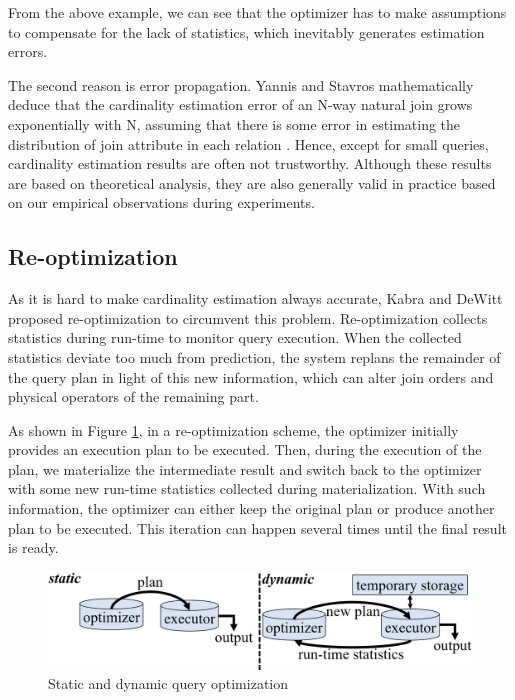     From the above example, we can see that the optimizer has to make assumptions to compensate for the lack of statistics, which inevitably generates estimation errors.\par
    The second reason is error propagation. Yannis and Stavros mathematically deduce that the cardinality estimation error of an N-way natural join grows exponentially with N, assuming that there is some error in estimating the distribution of join attribute in each relation \cite{paper31}. Hence, except for small queries, cardinality estimation results are often not trustworthy. Although these results are based on theoretical analysis, they are also generally valid in practice based on our empirical observations during experiments.\par

\subsection{Re-optimization} \label{S22}
    As it is hard to make cardinality estimation always accurate, Kabra and DeWitt proposed re-optimization \cite{Reopt} to circumvent this problem. Re-optimization collects statistics during run-time to monitor query execution. When the collected statistics deviate too much from prediction, the system replans the remainder of the query plan in light of this new information, which can alter join orders and physical operators of the remaining part.\par
    As shown in Figure \ref{F1}, in a re-optimization scheme, the optimizer initially provides an execution plan to be executed. Then, during the execution of the plan, we materialize the intermediate result and switch back to the optimizer with some new run-time statistics collected during materialization. With such information, the optimizer can either keep the original plan or produce another plan to be executed. This iteration can happen several times until the final result is ready.\par
    \begin{figure}
        \centering
        \includegraphics[width=\linewidth]{./pic/Figure1.png}
        \caption{Static and dynamic query optimization}
        \label{F1}
    \end{figure}\par
